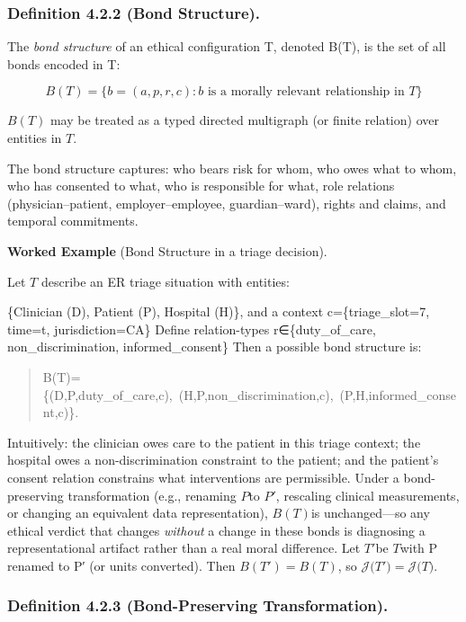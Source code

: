 \documentclass[12pt]{article}
\theoremstyle{plain}
\theoremstyle{definition}
\theoremstyle{remark}
\begin{document}
\subsubsection{Definition 4.2.2 (Bond
Structure).}\label{definition-4.2.2-bond-structure.}

The \emph{bond structure} of an ethical configuration T, denoted B(T),
is the set of all bonds encoded in T:

\[B(T) = \{ b = (a,p,r,c):b\text{ is a morally relevant relationship in }T\}\]

\(B(T)\) may be treated as a typed directed multigraph (or finite
relation) over entities in \(T\).

The bond structure captures: who bears risk for whom, who owes what to
whom, who has consented to what, who is responsible for what, role
relations (physician--patient, employer--employee, guardian--ward),
rights and claims, and temporal commitments.

\textbf{Worked Example} (Bond Structure in a triage decision).

Let \(T\) describe an ER triage situation with entities:

\{Clinician (D), Patient (P), Hospital (H)\}, and a context
c=\{triage\_slot=7, time=t, jurisdiction=CA\} Define relation-types
r∈\{duty\_of\_care, non\_discrimination, informed\_consent\} Then a
possible bond structure is:

\begin{quote}
B(T)=\{(D,P,duty\_of\_care,c),~(H,P,non\_discrimination,c),~(P,H,informed\_consent,c)\}.
\end{quote}

Intuitively: the clinician owes care to the patient in this triage
context; the hospital owes a non-discrimination constraint to the
patient; and the patient's consent relation constrains what
interventions are permissible. Under a bond-preserving transformation
(e.g., renaming \(P\)to \(P'\), rescaling clinical measurements, or
changing an equivalent data representation), \(B(T)\)is unchanged---so
any ethical verdict that changes \emph{without} a change in these bonds
is diagnosing a representational artifact rather than a real moral
difference. Let \(T'\)be \(T\)with P renamed to P′ (or units converted).
Then \(B(T') = B(T)\), so \(\mathcal{J(}T'\mathcal{) = J(}T)\).

\subsubsection{\texorpdfstring{Definition 4.2.3 (Bond-Preserving
Transformation).
}{Definition 4.2.3 (Bond-Preserving Transformation). }}\label{definition-4.2.3-bond-preserving-transformation.}
\end{document}

